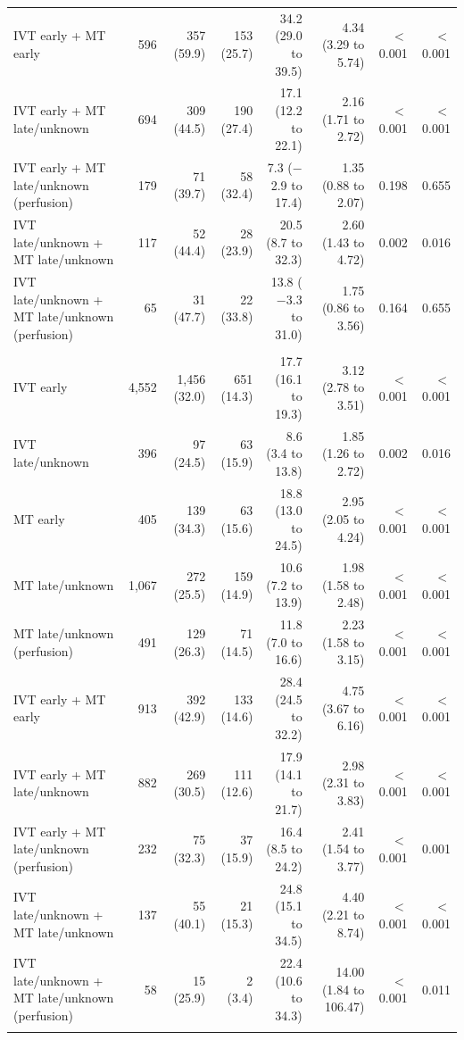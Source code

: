 \begin{landscape}
\begin{longtable}{p{5.6cm}rrrrrrr}
IVT early + MT early & 596 & 357 (59.9) & 153 (25.7) & 34.2 (29.0 to 39.5) & 4.34 (3.29 to 5.74) & $<$0.001 & $<$0.001 \\
IVT early + MT late/unknown & 694 & 309 (44.5) & 190 (27.4) & 17.1 (12.2 to 22.1) & 2.16 (1.71 to 2.72) & $<$0.001 & $<$0.001 \\
IVT early + MT late/unknown (perfusion) & 179 & 71 (39.7) & 58 (32.4) & 7.3 ($-$2.9 to 17.4) & 1.35 (0.88 to 2.07) & 0.198 & 0.655 \\
IVT late/unknown + MT late/unknown & 117 & 52 (44.4) & 28 (23.9) & 20.5 (8.7 to 32.3) & 2.60 (1.43 to 4.72) & 0.002 & 0.016 \\
IVT late/unknown + MT late/unknown (perfusion) & 65 & 31 (47.7) & 22 (33.8) & 13.8 ($-$3.3 to 31.0) & 1.75 (0.86 to 3.56) & 0.164 & 0.655 \\
\addlinespace
\multicolumn{8}{l}{\textbf{NIHSS 16--20}}\\
IVT early & 4,552 & 1,456 (32.0) & 651 (14.3) & 17.7 (16.1 to 19.3) & 3.12 (2.78 to 3.51) & $<$0.001 & $<$0.001 \\
IVT late/unknown & 396 & 97 (24.5) & 63 (15.9) & 8.6 (3.4 to 13.8) & 1.85 (1.26 to 2.72) & 0.002 & 0.016 \\
MT early & 405 & 139 (34.3) & 63 (15.6) & 18.8 (13.0 to 24.5) & 2.95 (2.05 to 4.24) & $<$0.001 & $<$0.001 \\
MT late/unknown & 1,067 & 272 (25.5) & 159 (14.9) & 10.6 (7.2 to 13.9) & 1.98 (1.58 to 2.48) & $<$0.001 & $<$0.001 \\
MT late/unknown (perfusion) & 491 & 129 (26.3) & 71 (14.5) & 11.8 (7.0 to 16.6) & 2.23 (1.58 to 3.15) & $<$0.001 & $<$0.001 \\
IVT early + MT early & 913 & 392 (42.9) & 133 (14.6) & 28.4 (24.5 to 32.2) & 4.75 (3.67 to 6.16) & $<$0.001 & $<$0.001 \\
IVT early + MT late/unknown & 882 & 269 (30.5) & 111 (12.6) & 17.9 (14.1 to 21.7) & 2.98 (2.31 to 3.83) & $<$0.001 & $<$0.001 \\
IVT early + MT late/unknown (perfusion) & 232 & 75 (32.3) & 37 (15.9) & 16.4 (8.5 to 24.2) & 2.41 (1.54 to 3.77) & $<$0.001 & 0.001 \\
IVT late/unknown + MT late/unknown & 137 & 55 (40.1) & 21 (15.3) & 24.8 (15.1 to 34.5) & 4.40 (2.21 to 8.74) & $<$0.001 & $<$0.001 \\
IVT late/unknown + MT late/unknown (perfusion) & 58 & 15 (25.9) & 2 (3.4) & 22.4 (10.6 to 34.3) & 14.00 (1.84 to 106.47) & $<$0.001 & 0.011 \\
\addlinespace

\end{longtable}
\end{landscape}
